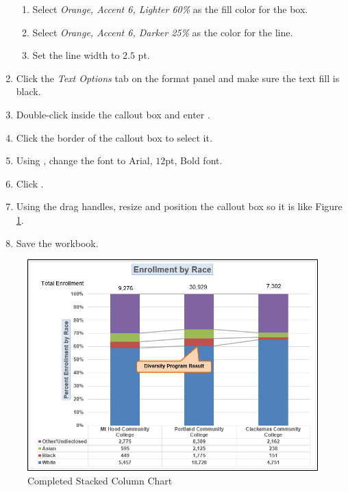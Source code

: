\begin{enumbox}
\begin{enumerate}
		\begin{enumerate}
			\item Select \textit{Orange, Accent 6, Lighter 60\%} as the fill color for the box.
			\item Select \textit{Orange, Accent 6, Darker 25\%} as the color for the line.
			\item Set the line width to $ 2.5 $ pt.
		\end{enumerate}
		
		\item Click the \textit{Text Options} tab on the format panel and make sure the text fill is black.
		\item Double-click inside the callout box and enter .
		\item Click the border of the callout box to select it.
		\item Using , change the font to Arial, $ 12 $pt, Bold font. 
		\item Click .
		\item Using the drag handles, resize and position the callout box so it is like Figure \ref{04:fig45}.
		\item Save the  workbook.
	\end{enumerate}
\end{enumbox}
	
\begin{figure}[H]
	\centering
	\includegraphics[width=\maxwidth{.95\linewidth}]{gfx/ch04_fig45}
	\caption{Completed Stacked Column Chart}
	\label{04:fig45}
\end{figure}

